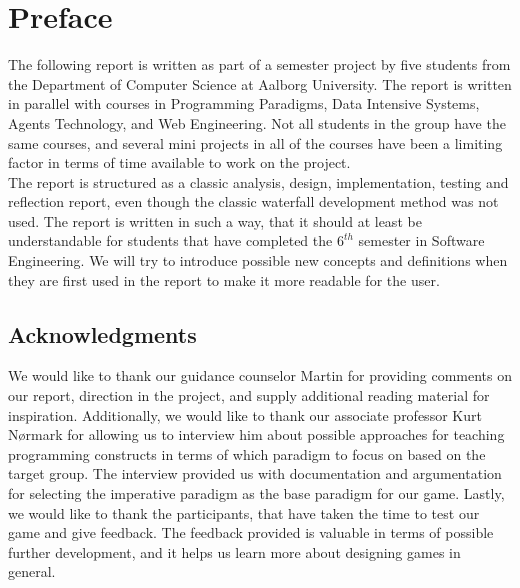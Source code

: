 \chapter*{Preface}

The following report is written as part of a semester project by five students from the Department of Computer Science at Aalborg University. The report is written in parallel with courses in Programming Paradigms, Data Intensive Systems, Agents Technology, and Web Engineering. Not all students in the group have the same courses, and several mini projects in all of the courses have been a limiting factor in terms of time available to work on the project.\\

The report is structured as a classic analysis, design, implementation, testing and reflection report, even though the classic waterfall development method was not used. The report is written in such a way, that it should at least be understandable for students that have completed the $6^{th}$ semester in Software Engineering. We will try to introduce possible new concepts and definitions when they are first used in the report to make it more readable for the user.

\section*{Acknowledgments}

We would like to thank our guidance counselor Martin  for providing comments on our report, direction in the project, and supply additional reading material for inspiration.
Additionally, we would like to thank our associate professor Kurt N{\o}rmark for allowing us to interview him about possible approaches for teaching programming constructs in terms of which paradigm to focus on based on the target group.
The interview provided us with documentation and argumentation for selecting the imperative paradigm as the base paradigm for our game.
Lastly, we would like to thank the participants, that have taken the time to test our game and give feedback.
The feedback provided is valuable in terms of possible further development, and it helps us learn more about designing games in general.
